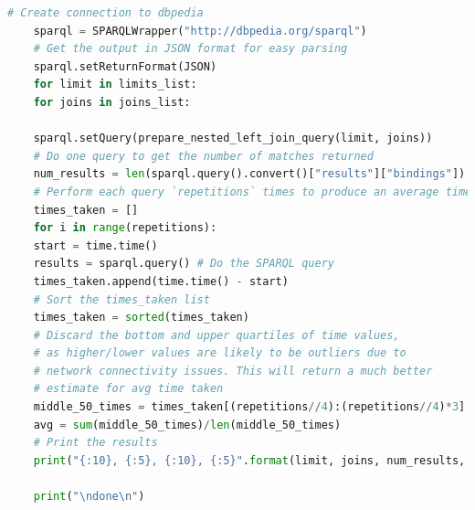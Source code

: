 \documentclass[10pt,a4paper]{article}
\begin{document}
\begin{lstlisting}[language=Python]
	# Create connection to dbpedia
	sparql = SPARQLWrapper("http://dbpedia.org/sparql")
	# Get the output in JSON format for easy parsing
	sparql.setReturnFormat(JSON)
	for limit in limits_list:
	for joins in joins_list:
	
	sparql.setQuery(prepare_nested_left_join_query(limit, joins))
	# Do one query to get the number of matches returned
	num_results = len(sparql.query().convert()["results"]["bindings"]) 
	# Perform each query `repetitions` times to produce an average time required
	times_taken = []
	for i in range(repetitions):
	start = time.time()
	results = sparql.query() # Do the SPARQL query
	times_taken.append(time.time() - start)
	# Sort the times_taken list
	times_taken = sorted(times_taken)
	# Discard the bottom and upper quartiles of time values,
	# as higher/lower values are likely to be outliers due to
	# network connectivity issues. This will return a much better
	# estimate for avg time taken
	middle_50_times = times_taken[(repetitions//4):(repetitions//4)*3]
	avg = sum(middle_50_times)/len(middle_50_times)
	# Print the results
	print("{:10}, {:5}, {:10}, {:5}".format(limit, joins, num_results, avg))
	
	print("\ndone\n")
	\end{lstlisting}
	
\end{document}
